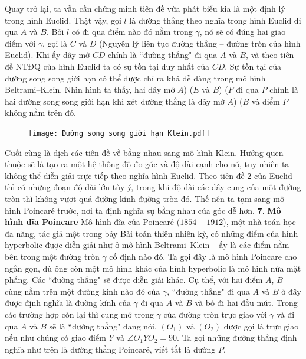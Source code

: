 \begin{multicols}{2}
	Quay trở lại, ta vẫn cần chứng minh tiên đề vừa phát biểu kia là một định lý trong hình Euclid.
	Thật vậy, gọi $l$ là đường thẳng theo nghĩa trong hình Euclid đi qua $A$ và $B$. Bởi $l$ có đi qua điểm nào đó nằm trong $\gamma$, nó sẽ có đúng hai giao điểm với $\gamma$, gọi là $C$ và $D$ (Nguyên lý liên tục đường thẳng -- đường tròn của hình Euclid). Khi ấy dây mở $CD$ chính là ``đường thẳng" đi qua $A$ và $B$, và theo tiên đề NTĐQ của hình Euclid ta có sự tồn tại duy nhất của $CD$.
	\vskip 0.1cm
	Sự tồn tại của  đường song song giới hạn có thể được chỉ ra khá dễ dàng trong mô hình Beltrami--Klein. Nhìn hình ta thấy, hai dây mở $A$) ($E$ và $B$) ($F$ đi qua $P$ chính là hai đường song song giới hạn khi xét đường thẳng là dây mở $A$) ($B$ và điểm $P$ không nằm trên đó.
	\begin{figure}[H]
		\vspace*{-5pt}
		\centering
		\captionsetup{labelformat= empty, justification=centering}
		\texttt{[image: Đường song song giới hạn Klein.pdf]}
		\vspace*{-10pt}
	\end{figure}
	Cuối cùng là dịch các tiên đề về bằng nhau sang mô hình Klein. Hướng quen thuộc sẽ là tạo ra một hệ thống độ đo góc và độ dài cạnh cho nó, tuy nhiên ta không thể diễn giải trực tiếp theo nghĩa hình Euclid. Theo tiên đề $2$ của Euclid thì có những đoạn độ dài lớn tùy ý, trong khi độ dài các dây cung của một đường tròn thì không vượt quá đường kính đường tròn đó.
	Thế nên ta tạm sang mô hình Poincaré trước, nơi ta định nghĩa sự bằng nhau của góc dễ hơn.
	\vskip 0.1cm
	$\pmb{7.}$ \textbf{\color{lichsutoanhoc}Mô hình đĩa Poincare}
	\vskip 0.1cm
	Mô hình đĩa của Poincaré ($1854 - 1912$), một nhà toán học đa năng, tác giả một trong bảy Bài toán thiên nhiên kỷ, có những điểm của hình hyperbolic được diễn giải như ở mô hình Beltrami--Klein -- ấy là các điểm nằm bên trong một đường tròn $\gamma $ cố định nào đó. Ta gọi đây là mô hình Poincare cho ngắn gọn, dù ông còn một mô hình khác của hình hyperbolic là mô hình nửa mặt phẳng. 
	Các ``đường thẳng" sẽ được diễn giải khác. Cụ thể, với hai điểm $A$, $B$ cùng nằm trên một đường kính nào đó của $\gamma$, ``đường thẳng" đi qua $A$ và $B$ ở đây được định nghĩa là đường kính của $\gamma$ đi qua $A$ và $B$ và bỏ đi hai đầu mút. Trong các trường hợp còn lại thì cung mở trong $\gamma$ của đường tròn trực giao với $\gamma$ và đi qua $A$ và $B$ sẽ là ``đường thẳng" đang nói. $(O_1)$ và $(O_2)$ được gọi là trực giao nếu như chúng có giao điểm $Y$ và $ \angle O_1YO_2 = 90$. Ta gọi những đường thẳng định nghĩa như trên là đường thẳng Poincaré, viết tắt là đường $P$. 

\end{multicols}
